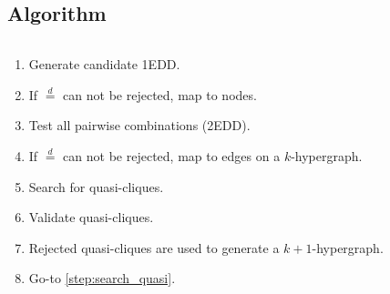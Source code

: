 \documentclass[10pt,notes]{beamer}
\newcommand{\eqdist}{\stackrel{d}{=}}
\begin{document}
\subsection{Algorithm}

\begin{frame}{}
    \begin{columns}
    \begin{column}{0.5\linewidth}
        \renewcommand{\theenumi}{\alph{enumi}}
        \begin{enumerate}
            \item Generate candidate 1EDD.
            \item If $\eqdist$ can not be rejected, map to nodes.
            \item Test all pairwise combinations (2EDD).
            \item If $\eqdist$ can not be rejected, map to edges on a $k$-hypergraph.
            \item Search for quasi-cliques\label{step:search_quasi}.
            \item Validate quasi-cliques.
            \item Rejected quasi-cliques are used to generate a $k+1$-hypergraph.
            \item Go-to \ref{step:search_quasi}.
        \end{enumerate}
    \end{column}
    \begin{column}{.5\linewidth}

\end{column}
\end{columns}
\end{frame}
\end{document}
